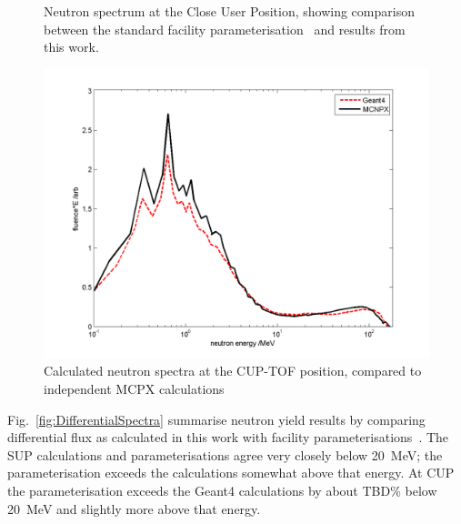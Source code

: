 \documentclass[11pt,a4paper]{IEEEtran}
\let\MYoriglatexcaption\caption
\renewcommand{\caption}[2][\relax]{\MYoriglatexcaption[#2]{#2}}
\begin{document}
\begin{figure}[t]
\begin{minipage}{\columnwidth}
    \end{minipage}
	\caption{
        Neutron spectrum at the Close User Position, showing comparison between the standard facility parameterisation~\cite{Prokofiev2009} and results from this work.
    }
	\label{fig:CUPSpectraComparison}
\end{figure}

\begin{figure}[t]
    \includegraphics[width=\columnwidth]{TOFcomparedLetFluxRADECS.png}
    \caption{
        Calculated neutron spectra at the CUP-TOF position, compared to independent MCPX calculations~\cite{Prokofiev14}
    }
    \label{fig:MCComparison}
\end{figure}

Fig.~\ref{fig:DifferentialSpectra} summarise neutron yield results by comparing differential flux as calculated in this work with facility parameterisations~\cite{Prokofiev2009,Prokofiev14}.
The SUP calculations and parameterisations agree very closely below \SI{20}{\MeV}; the parameterisation exceeds the calculations somewhat above that energy.
At CUP the parameterisation exceeds the Geant4 calculations by about TBD\% below \SI{20}{\MeV} and slightly more above that energy.
\end{document}
